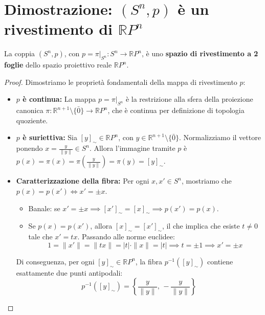 \vspace{2em}

\section{Dimostrazione: $(S^n, p)$ \`e un rivestimento di $\mathbb{R}P^n$}

\begin{teo}
La coppia $(S^n, p)$, con $p = \pi|_{S^n}: S^n \to \mathbb{R}P^n$, è uno \textbf{spazio di rivestimento a 2 foglie} dello spazio proiettivo reale $\mathbb{R}P^n$.
\end{teo}

\begin{proof}
Dimostriamo le proprietà fondamentali della mappa di rivestimento $p$:

\begin{itemize}
    \item \textbf{$p$ è continua:}
    La mappa $p = \pi|_{S^n}$ è la restrizione alla sfera della proiezione canonica $\pi: \mathbb{R}^{n+1} \setminus \{\bar{0}\} \to \mathbb{R}P^n$, che è continua per definizione di topologia quoziente.

    \item \textbf{$p$ è suriettiva:}
    Sia $[y]_\sim \in \mathbb{R}P^n$, con $y \in \mathbb{R}^{n+1} \setminus \{\bar{0}\}$.
    Normalizziamo il vettore ponendo $x = \frac{y}{\|y\|} \in S^n$.
    Allora l'immagine tramite $p$ è $p(x) = \pi(x) = \pi\left(\frac{y}{\|y\|}\right) = \pi(y) = [y]_\sim$.

    \item \textbf{Caratterizzazione della fibra:}
    Per ogni $x, x' \in S^n$, mostriamo che $p(x) = p(x') \iff x' = \pm x$.
    \begin{itemize}
        \item[$\impliedby$)] Banale: se $x' = \pm x \implies [x']_\sim = [x]_\sim \implies p(x') = p(x)$.
        \item[$\implies$)] Se $p(x) = p(x')$, allora $[x]_\sim = [x']_\sim$, il che implica che esiste $t \neq 0$ tale che $x' = t x$.
        Passando alle norme euclidee:
        \[
        1 = \|x'\| = \|t x\| = |t| \cdot \|x\| = |t| \implies t = \pm 1 \implies x' = \pm x
        \]
    \end{itemize}
    Di conseguenza, per ogni $[y]_\sim \in \mathbb{R}P^n$, la fibra $p^{-1}([y]_\sim)$ contiene esattamente due punti antipodali:
    \[
    p^{-1}([y]_\sim) = \left\{ \frac{y}{\|y\|}, \, -\frac{y}{\|y\|} \right\}
    \]
\end{itemize}


\end{proof}
